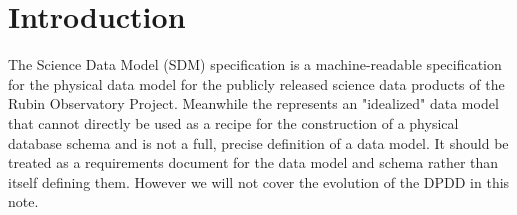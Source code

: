 
\section{Introduction}

The Science Data Model (SDM) specification is a machine-readable specification for the physical data model for the publicly released science data products of the Rubin Observatory Project.
Meanwhile the \DPDD  represents an "idealized" data model that cannot directly be used as a recipe for the construction of a physical database schema and is not a full, precise definition of a data model.
It should be treated as a requirements document for the data model and schema rather than itself defining them. However we will not cover the evolution of the DPDD in this note.


